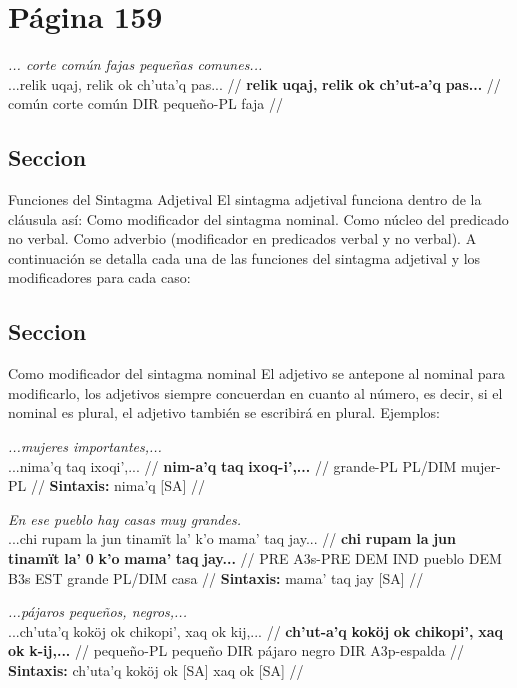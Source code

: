 \documentclass{article}%
\begin{document}
%
\section{Página 159}%
\label{sec:Pgina159}%
\par\medskip%
\ex
\textit{... corte común fajas pequeñas comunes...} \\
\begingl
\gla ...relik uqaj, relik ok ch'uta'q pas... //
\glb \textbf{relik} \textbf{uqaj,} \textbf{relik} \textbf{ok} \textbf{ch'ut-}\textbf{a'q} \textbf{pas...} //
\glc común corte común DIR pequeño-PL faja //
\endgl
\xe
%
\medskip%
\subsection{Seccion}%
\label{subsec:Seccion}%

%
Funciones del Sintagma Adjetival %
El sintagma adjetival funciona dentro de la cláusula así: %
Como modificador del sintagma nominal. %
Como núcleo del predicado no verbal. %
Como adverbio (modificador en predicados verbal y no verbal). %
A continuación se detalla cada una de las funciones del sintagma adjetival y los %
modificadores para cada caso: %
\subsection{Seccion}%
\label{subsec:Seccion}%

%
Como modificador del sintagma nominal %
El adjetivo se antepone al nominal para modificarlo, los adjetivos siempre concuerdan %
en cuanto al número, es decir, si el nominal es plural, el adjetivo también se escribirá %
en plural. Ejemplos: %
\par\medskip%
\ex
\textit{...mujeres importantes,...} \\
\begingl
\gla ...nima'q taq ixoqi',... //
\glb \textbf{nim-}\textbf{a'q} \textbf{taq} \textbf{ixoq-}\textbf{i',...} //
\glc grande-PL PL/DIM mujer-PL //
\glft \textbf{Sintaxis:} nima'q [\textsc{SA}] //
\endgl
\xe
%
\medskip%
\par\medskip%
\ex
\textit{En ese pueblo hay casas muy grandes.} \\
\begingl
\gla ...chi rupam la jun tinamït la' k'o mama' taq jay... //
\glb \textbf{chi} \textbf{rupam} \textbf{la} \textbf{jun} \textbf{tinamït} \textbf{la'} \textbf{0} \textbf{k'o} \textbf{mama'} \textbf{taq} \textbf{jay...} //
\glc PRE A3s-PRE DEM IND pueblo DEM B3s EST grande PL/DIM casa //
\glft \textbf{Sintaxis:} mama' taq jay [\textsc{SA}] //
\endgl
\xe
%
\medskip%
\par\medskip%
\ex
\textit{...pájaros pequeños, negros,...} \\
\begingl
\gla ...ch'uta'q koköj ok chikopi', xaq ok kij,... //
\glb \textbf{ch'ut-}\textbf{a'q} \textbf{koköj} \textbf{ok} \textbf{chikopi',} \textbf{xaq} \textbf{ok} \textbf{k-}\textbf{ij,...} //
\glc pequeño-PL pequeño DIR pájaro negro DIR A3p-espalda //
\glft \textbf{Sintaxis:} ch'uta'q koköj ok [\textsc{SA}] xaq ok [\textsc{SA}] //
\endgl
\xe
%
\medskip
\end{document}
